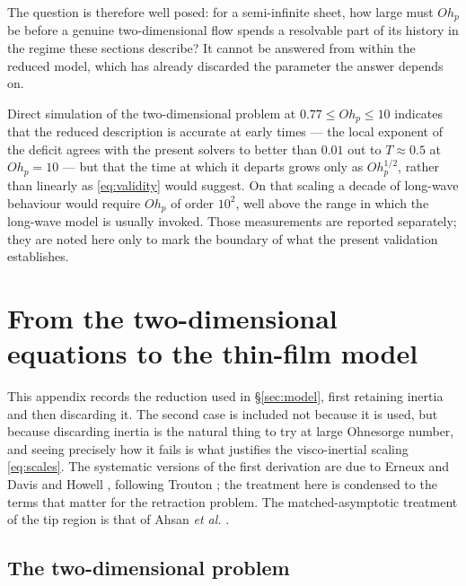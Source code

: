 \documentclass[11pt,a4paper]{article}
\begin{document}
The question is therefore well posed: for a semi-infinite sheet, how large must
$Oh_{p}$ be before a genuine two-dimensional flow spends a resolvable part of
its history in the regime these sections describe? It cannot be answered from
within the reduced model, which has already discarded the parameter the answer
depends on.

Direct simulation of the two-dimensional problem at
$0.77 \le Oh_{p} \le 10$ indicates that the reduced description is accurate at
early times --- the local exponent of the deficit agrees with the present
solvers to better than $0.01$ out to $T \approx 0.5$ at $Oh_{p} = 10$ --- but
that the time at which it departs grows only as $Oh_{p}^{1/2}$, rather than
linearly as \eqref{eq:validity} would suggest. On that scaling a decade of
long-wave behaviour would require $Oh_{p}$ of order $10^{2}$, well above the
range in which the long-wave model is usually invoked. Those measurements are
reported separately; they are noted here only to mark the boundary of what the
present validation establishes.

\appendix

\section{From the two-dimensional equations to the thin-film model}
\label{sec:derivation}

This appendix records the reduction used in \S\ref{sec:model}, first retaining
inertia and then discarding it. The second case is included not because it is
used, but because discarding inertia is the natural thing to
try at large Ohnesorge number, and seeing precisely how it fails is what
justifies the visco-inertial scaling \eqref{eq:scales}. The systematic versions
of the first derivation are due to Erneux and Davis \cite{erneux1993} and
Howell \cite{howell1996}, following Trouton \cite{trouton1906}; the treatment
here is condensed to the terms that matter for the retraction problem. The
matched-asymptotic treatment of the tip region is that of Ahsan \textit{et al.}
\cite{ahsan2025}.

\subsection{The two-dimensional problem}
\end{document}
